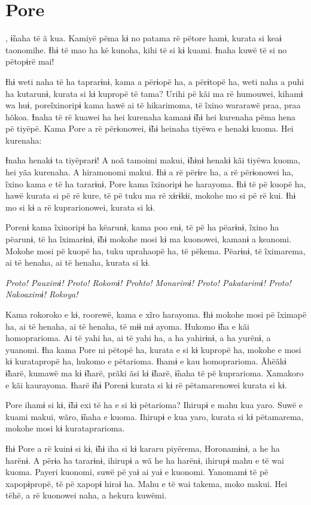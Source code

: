 \chapter{Pore}
 
, ɨ̃naha të ã kua. Kamiyë pëma kɨ no patama rë pëtore hamɨ, kurata si
keaɨ taonomihe. Ɨhɨ të mao ha kë kunoha, kihi të si kɨ kuami. Ɨnaha kuwë
të si no pëtopɨrë mai! 

Ɨhɨ weti naha të ha taprarɨnɨ, kama a përɨopë ha, a përɨtopë ha, weti
naha a puhi ha kutarunɨ, kurata si kɨ kupropë të tama? Urihi pë kãi ma
rë humouwei, kihamɨ wa huɨ, poreĩxinoripɨ kama hawë ai të hikarimoma, të
ĩxino wararawë praa, praa hõkoa. Ɨnaha të rë kuawei ha hei kurenaha
kamanɨ ɨ̃hɨ hei kurenaha pëma hena pë tiyëpë. Kama Pore a rë përɨonowei,
ɨ̃hɨ heinaha tiyëwa e henakɨ kuoma. Hei kurenaha:

Ɨnaha henakɨ ta tiyëprarɨ! A noã tamoimi makui, ɨ̃hɨnɨ henakɨ kãi tiyëwa
kuoma, hei yãa kurenaha. A hiramonomi makui. Ɨhɨ a rë përɨre ha, a rë
përɨonowei ha, ĩxino kama e të ha tararɨnɨ, Pore kama ĩxinoripɨ he
harayoma. Ɨhɨ të pë kuopë ha, hawë kurata si pë rë kure, të pë tuku ma
rë xɨrɨkɨi, mokohe mo si pë rë kui. Ɨhɨ mo si kɨ a rë kuprarionowei,
kurata si kɨ. 

Porenɨ kama ĩxinoripɨ ha këarunɨ, kama poo enɨ, të pë ha pëarɨnɨ, ĩxino
ha pëarunɨ, të ha ĩximarɨnɨ, ɨ̃hɨ mokohe mosi kɨ ma kuonowei, kamanɨ a
keanomi. Mokohe mosi pë kuopë ha, tuku uprahaopë ha, të pëkema. Pëarɨnɨ,
të ĩximarema, ai të henaha, ai të henaha, kurata si kɨ.

\textit{Proto! Pauximɨ! Proto! Rokomɨ! Prohto! Monarimɨ! Proto! Pakatarimɨ!
Proto! Nakoaximɨ! Rokoya!} 

Kama rokoroko e kɨ, roorewë, kama e xĩro
harayoma. Ɨhɨ mokohe mosi pë ĩximapë ha, ai të henaha, ai të henaha, të
mɨɨ mɨ ayoma. Hukomo ɨ̃ha e kãi homoprarioma. Ai të yahi ha, ai të yahi
ha, a ha yahirɨnɨ, a ha yurënɨ, a yuanomi. Ɨha kama Pore ni pëtopë ha,
kurata e si kɨ kupropë ha, mokohe e mosi kɨ kuratapropë ha, hukomo e
pëtarioma. Ɨhamɨ e kau homoprarioma. Ãhëãkɨ ɨ̃harë, kumawë ma kɨ ɨ̃harë,
prãki ãsi kɨ ɨ̃harë, ɨ̃naha të pë kuprarioma. Xamakoro e kãi kaurayoma.
Ɨharë ɨ̃hɨ Porenɨ kurata si kɨ rë pëtamarenowei kurata si kɨ. 

Pore ihamɨ si kɨ, ɨ̃hɨ exi të ha e si kɨ pëtarioma? Ihirupɨ e mahu kua
yaro. Suwë e kuami makui, wãro, ɨ̃naha e kuoma. Ihirupɨ e kua yaro,
kurata si kɨ pëtamarema, mokohe mosi kɨ kurataprarioma. 

Ɨhɨ Pore a rë kuinɨ si kɨ, ɨ̃hɨ iha si kɨ kararu piyërema, Horonamɨnɨ, a
he ha harënɨ. A përɨa ha tararɨnɨ, ihirupɨ a wã he ha harënɨ, ihirupɨ
mahu e të wai kuoma. Payeri kuonomi, suwë pë yaɨ ai yaɨ e kuonomi.
Yanomamɨ të pë xapopɨpropë, të pë xapopɨ hiraɨ ha. Mahu e të wai takema,
moko makui. Hei tëhë, a rë kuonowei naha, a hekura kuwëmi. 

